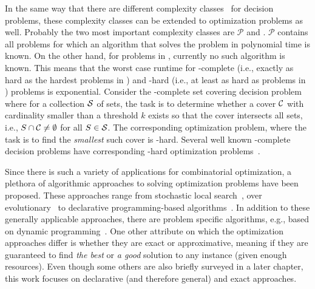 In the same way that there are different complexity classes~\autocite{} for decision problems, these complexity classes can be extended to optimization problems as well.
Probably the two most important complexity classes are $\mathcal{P}$ and \NP.
$\mathcal{P}$ contains all problems for which an algorithm that solves the problem in polynomial time is known.
On the other hand, for problems in \NP, currently no such algorithm is known.
This means that the worst case runtime for \NP-complete (i.e., exactly as hard as the hardest problems in \NP) and \NP-hard (i.e., at least as hard as problems in \NP) problems is exponential.
Consider the \NP-complete set covering decision problem~\autocite{DBLP:conf/coco/Karp72} where for a collection $\mathcal{S}$ of sets, the task is to determine whether a cover $\mathcal{C}$ with cardinality smaller than a threshold $k$ exists so that the cover intersects all sets, i.e., $S \cap \mathcal{C} \neq \emptyset$ for all $S\in\mathcal{S}$.
The corresponding optimization problem, where the task is to find the \emph{smallest} such cover is \NP-hard.
Several well known \NP-complete decision problems have corresponding \NP-hard optimization problems~\autocite{KorteVygen2018-15}.

Since there is such a variety of applications for combinatorial optimization, a plethora of algorithmic approaches to solving optimization problems have been proposed.
These approaches range from stochastic local search~\autocite{}, over evolutionary~\autocites{Dasgupta2013,DBLP:journals/jgo/StornP97} to declarative programming-based algorithms~\autocite{}.
In addition to these generally applicable approaches, there are problem specific algorithms, e.g., based on dynamic programming~\autocite{DBLP:conf/aaai/DemirovicS21}.
One other attribute on which the optimization approaches differ is whether they are exact or approximative, meaning if they are guaranteed to find \emph{the best} or \emph{a good} solution to any instance (given enough resources).
Even though some others are also briefly surveyed in a later chapter, this work focuses on declarative (and therefore general) and exact approaches.

